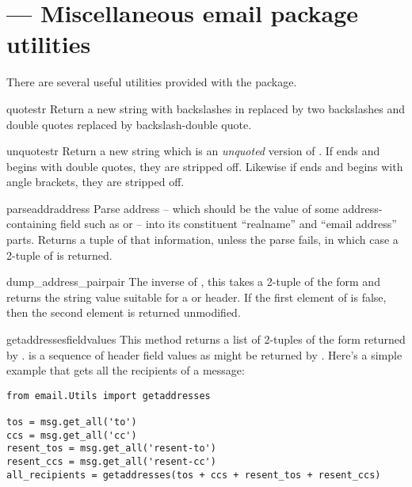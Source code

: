 \section{ ---
         Miscellaneous email package utilities}



There are several useful utilities provided with the 
package.

\begin{funcdesc}{quote}{str}
Return a new string with backslashes in  replaced by two
backslashes and double quotes replaced by backslash-double quote.
\end{funcdesc}

\begin{funcdesc}{unquote}{str}
Return a new string which is an \emph{unquoted} version of .
If  ends and begins with double quotes, they are stripped
off.  Likewise if  ends and begins with angle brackets, they
are stripped off.
\end{funcdesc}

\begin{funcdesc}{parseaddr}{address}
Parse address -- which should be the value of some address-containing
field such as  or  -- into its constituent
``realname'' and ``email address'' parts.  Returns a tuple of that
information, unless the parse fails, in which case a 2-tuple of
 is returned.
\end{funcdesc}

\begin{funcdesc}{dump_address_pair}{pair}
The inverse of , this takes a 2-tuple of the form
 and returns the string value suitable
for a  or  header.  If the first element of
 is false, then the second element is returned unmodified.
\end{funcdesc}

\begin{funcdesc}{getaddresses}{fieldvalues}
This method returns a list of 2-tuples of the form returned by
.   is a sequence of header field
values as might be returned by .  Here's a
simple example that gets all the recipients of a message:

\begin{verbatim}
from email.Utils import getaddresses

tos = msg.get_all('to')
ccs = msg.get_all('cc')
resent_tos = msg.get_all('resent-to')
resent_ccs = msg.get_all('resent-cc')
all_recipients = getaddresses(tos + ccs + resent_tos + resent_ccs)
\end{verbatim}
\end{funcdesc}

